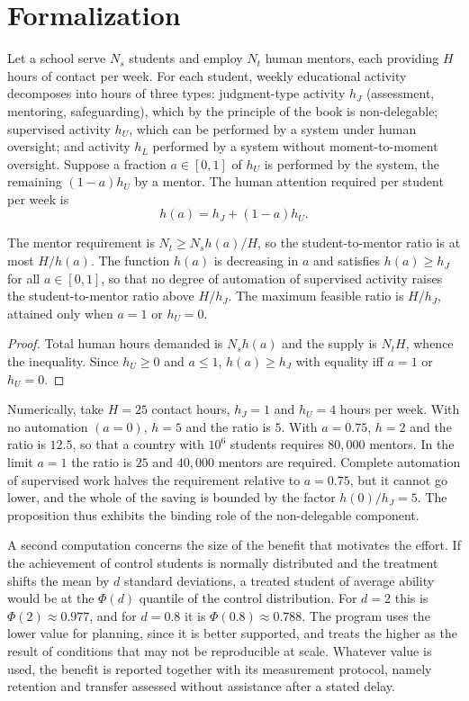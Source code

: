 \section*{Formalization}

Let a school serve $N_s$ students and employ $N_t$ human mentors, each providing $H$ hours of contact per week. For each student, weekly educational activity decomposes into hours of three types: judgment-type activity $h_J$ (assessment, mentoring, safeguarding), which by the principle of the book is non-delegable; supervised activity $h_U$, which can be performed by a system under human oversight; and activity $h_L$ performed by a system without moment-to-moment oversight. Suppose a fraction $a\in[0,1]$ of $h_U$ is performed by the system, the remaining $(1-a)h_U$ by a mentor. The human attention required per student per week is
\[
h(a)=h_J+(1-a)h_U .
\]

\begin{proposition}
The mentor requirement is $N_t\ge N_sh(a)/H$, so the student-to-mentor ratio is at most $H/h(a)$. The function $h(a)$ is decreasing in $a$ and satisfies $h(a)\ge h_J$ for all $a\in[0,1]$, so that no degree of automation of supervised activity raises the student-to-mentor ratio above $H/h_J$. The maximum feasible ratio is $H/h_J$, attained only when $a=1$ or $h_U=0$.
\end{proposition}

\begin{proof}
Total human hours demanded is $N_sh(a)$ and the supply is $N_tH$, whence the inequality. Since $h_U\ge0$ and $a\le1$, $h(a)\ge h_J$ with equality iff $a=1$ or $h_U=0$.
\end{proof}

Numerically, take $H=25$ contact hours, $h_J=1$ and $h_U=4$ hours per week. With no automation $(a=0)$, $h=5$ and the ratio is $5$. With $a=0.75$, $h=2$ and the ratio is $12.5$, so that a country with $10^6$ students requires $80{,}000$ mentors. In the limit $a=1$ the ratio is $25$ and $40{,}000$ mentors are required. Complete automation of supervised work halves the requirement relative to $a=0.75$, but it cannot go lower, and the whole of the saving is bounded by the factor $h(0)/h_J=5$. The proposition thus exhibits the binding role of the non-delegable component.

A second computation concerns the size of the benefit that motivates the effort. If the achievement of control students is normally distributed and the treatment shifts the mean by $d$ standard deviations, a treated student of average ability would be at the $\Phi(d)$ quantile of the control distribution. For $d=2$ this is $\Phi(2)\approx0.977$, and for $d=0.8$ it is $\Phi(0.8)\approx0.788$. The program uses the lower value for planning, since it is better supported, and treats the higher as the result of conditions that may not be reproducible at scale. Whatever value is used, the benefit is reported together with its measurement protocol, namely retention and transfer assessed without assistance after a stated delay.
